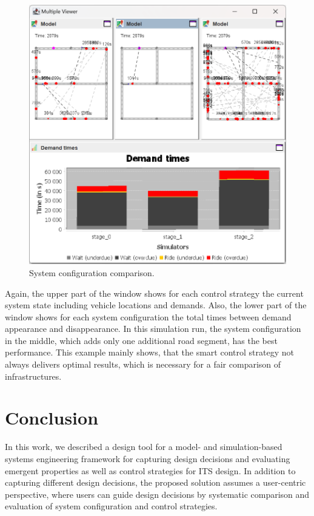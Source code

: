 \documentclass[a4paper,twoside]{article}
\begin{document}
	\begin{figure}[!ht]
		\includegraphics[width=\columnwidth]{infrastructure_comparison.png}
		\caption{System configuration comparison.}
		\label{fig:infratructure-comparison}
	\end{figure}
	
	Again, the upper part of the window shows for each control strategy the current system state including vehicle locations and demands.
	Also, the lower part of the window shows for each system configuration the total times between demand appearance and disappearance.
	In this simulation run, the system configuration in the middle, which adds only one additional road segment, has the best performance.
	This example mainly shows, that the smart control strategy not always delivers optimal results, which is necessary for a fair comparison of infrastructures.
	
	\section{Conclusion}
	\label{sec:conclusion}
	
In this work, we described a design tool for a model- and simulation-based systems engineering framework for capturing design decisions and evaluating emergent properties as well as control strategies for ITS design. In addition to capturing different design decisions, the proposed solution assumes a user-centric perspective, where users can guide design decisions by systematic comparison and evaluation of system configuration and control strategies.
	
	
	
	{\small
		}
	
	
\end{document}
